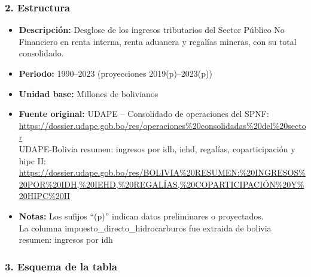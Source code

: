 \documentclass[12pt,a4paper]{article}
\begin{document}
\subsubsection*{2. Estructura}
\begin{itemize}
  \item \textbf{Descripción:} Desglose de los ingresos tributarios del Sector Público No Financiero en renta interna, renta aduanera y regalías mineras, con su total consolidado.
  \item \textbf{Periodo:} 1990–2023 (proyecciones 2019(p)–2023(p))
  \item \textbf{Unidad base:} Millones de bolivianos
  \item \textbf{Fuente original:} UDAPE – Consolidado de operaciones del SPNF:\\
    \url{https://dossier.udape.gob.bo/res/operaciones%20consolidadas%20del%20sector} \\
    UDAPE-Bolivia resumen: ingresos por idh, iehd, regalías, coparticipación y hipc II: \\
    \url{https://dossier.udape.gob.bo/res/BOLIVIA%20RESUMEN:%20INGRESOS%20POR%20IDH,%20IEHD,%20REGALÍAS,%20COPARTICIPACIÓN%20Y%20HIPC%20II}
  \item \textbf{Notas:} Los sufijos “(p)” indican datos preliminares o proyectados.\\
    La columna impuesto\_directo\_hidrocarburos fue extraida de bolivia resumen: ingresos por idh
  
\end{itemize}

\subsubsection*{3. Esquema de la tabla}
\end{document}
